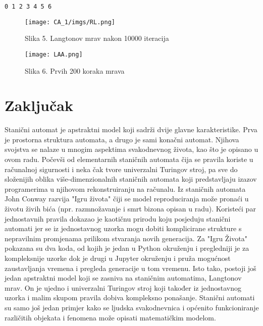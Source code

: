 \documentclass[11pt]{article}
\makeatletter
\def\maxwidth{\ifdim\Gin@nat@width>\linewidth\linewidth
    \else\Gin@nat@width\fi}
\let\Oldincludegraphics\includegraphics
\renewcommand{\includegraphics}[1]{\Oldincludegraphics[width=.8\maxwidth]{#1}}
\makeatother
\begin{document}
    \begin{Verbatim}[commandchars=\\\{\}]
0 1 2 3 4 5 6 
    \end{Verbatim}

    \begin{figure}
\centering
\texttt{[image: CA\_1/imgs/RL.png]}
\caption{Slika 5. Langtonov mrav nakon 10000 iteracija}
\end{figure}

    

    \begin{figure}
\centering
\texttt{[image: LAA.png]}
\caption{Slika 6. Prvih 200 koraka mrava}
\end{figure}

	 \section{Zaključak}\label{zakljucak}
Stanični automat je apstraktni model koji sadrži dvije glavne karakteristike. Prva je prostorna struktura automata, a drugo je sami konačni automat.
Njihova svojstva se nalaze u mnogim aspektima svakodnevnog života, kao što je opisano u ovom radu.
Počevši od elementarnih staničnih automata čija se pravila koriste u računalnoj sigurnosti
i neka čak tvore univerzalni Turingov stroj, pa sve do složenijih oblika više-dimenzionalnih staničnih automata koji predstavljaju izazov programerima u njihovom rekonstruiranju na računalu. Iz staničnih automata John Conway razvija "Igru života" čiji se model
reproduciranja može pronaći u životu živih bića (npr. razmnožavanje i smrt bizona opisan u radu). Koristeći par jednostavnih pravila dokazao je kaotičnu prirodu koju posjeduju stanični automati jer se iz jednostavnog uzorka mogu dobiti komplicirane strukture s nepravilnim promjenama prilikom stvaranja novih generacija.
Za "Igru Života" pokazana su dva koda, od kojih je jedan u Python okruženju i pregledniji je za kompleksnije uzorke dok je drugi u Jupyter okruženju i pruža mogućnost zaustavljanja vremena i pregleda generacije u tom vremenu.
Isto tako, postoji još jedan apstraktni model koji se zasniva na staničnim automatima, Langtonov mrav. On je ujedno i univerzalni Turingov stroj koji također iz jednostavnog uzorka i malim skupom pravila dobiva kompleksno ponašanje. 
Stanični automati su samo još jedan primjer kako se ljudska svakodnevnica i općenito funkcioniranje različitih objekata i fenomena može opisati matematičkim modelom.



\clearpage
\end{document}

